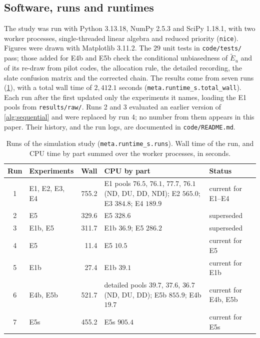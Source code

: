 \subsection{Software, runs and runtimes}\label{app:sim-runs}

The study was run with Python 3.13.18, NumPy 2.5.3 and SciPy 1.18.1, with two worker processes, single-threaded linear algebra and reduced priority (\texttt{nice}). Figures were drawn with Matplotlib 3.11.2. The $29$ unit tests in \texttt{code/tests/} pass; those added for E4b and E5b check the conditional unbiasedness of $\widetilde E_u$ and of its re-draw from pilot codes, the allocation rule, the detailed recording, the slate confusion matrix and the corrected chain. The results come from seven runs (\cref{tab:sim-runs}), with a total wall time of $2{,}412.1$ seconds (\texttt{meta.runtime\_s.total\_wall}). Each run after the first updated only the experiments it names, loading the E1 pools from \texttt{results/raw/}. Runs 2 and 3 evaluated an earlier version of \cref{alg:sequential} and were replaced by run 4; no number from them appears in this paper. Their history, and the run logs, are documented in \texttt{code/README.md}.

\begin{table}[tp]
\centering
\caption{Runs of the simulation study (\texttt{meta.runtime\_s.runs}). Wall time of the run, and CPU time by part summed over the worker processes, in seconds.}\label{tab:sim-runs}
\footnotesize
\setlength{\tabcolsep}{4pt}
\begin{tabularx}{\textwidth}{@{}cl r >{\raggedright\arraybackslash}X >{\raggedright\arraybackslash}p{2.9cm}@{}}
\toprule
Run & Experiments & Wall & CPU by part & Status \\
\midrule
1 & E1, E2, E3, E4 & 755.2 & E1 pools $76.5$, $76.1$, $77.7$, $76.1$ (ND, DU, DD, NDI); E2 $565.0$; E3 $384.8$; E4 $189.9$ & current for E1--E4 \\
2 & E5 & 329.6 & E5 $328.6$ & superseded \\
3 & E1b, E5 & 311.7 & E1b $36.9$; E5 $286.2$ & superseded \\
4 & E5 & 11.4 & E5 $10.5$ & current for E5 \\
5 & E1b & 27.4 & E1b $39.1$ & current for E1b \\
6 & E4b, E5b & 521.7 & detailed pools $39.7$, $37.6$, $36.7$ (ND, DU, DD); E5b $855.9$; E4b $19.7$ & current for E4b, E5b \\
7 & E5s & 455.2 & E5s $905.4$ & current for E5s \\
\bottomrule
\end{tabularx}
\end{table}

